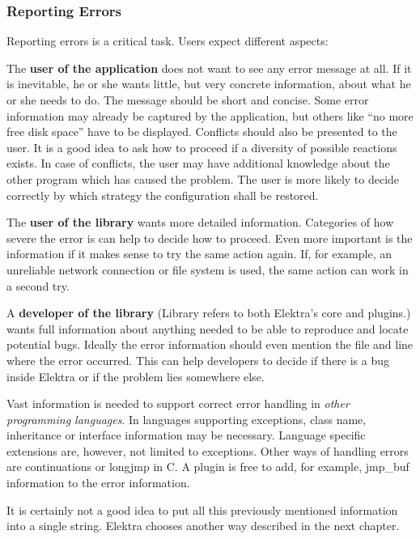 \subsubsection*{Reporting Errors}

Reporting errors is a critical task. Users expect different aspects\+:


\begin{DoxyItemize}
\item The {\bfseries user of the application} does not want to see any error message at all. If it is inevitable, he or she wants little, but very concrete information, about what he or she needs to do. The message should be short and concise. Some error information may already be captured by the application, but others like “no more free disk space” have to be displayed. Conflicts should also be presented to the user. It is a good idea to ask how to proceed if a diversity of possible reactions exists. In case of conflicts, the user may have additional knowledge about the other program which has caused the problem. The user is more likely to decide correctly by which strategy the configuration shall be restored.
\item The {\bfseries user of the library} wants more detailed information. Categories of how severe the error is can help to decide how to proceed. Even more important is the information if it makes sense to try the same action again. If, for example, an unreliable network connection or file system is used, the same action can work in a second try.
\item A {\bfseries developer of the library} (Library refers to both Elektra’s core and plugins.) wants full information about anything needed to be able to reproduce and locate potential bugs. Ideally the error information should even mention the file and line where the error occurred. This can help developers to decide if there is a bug inside Elektra or if the problem lies somewhere else.
\item Vast information is needed to support correct error handling in {\itshape other programming languages}. In languages supporting exceptions, class name, inheritance or interface information may be necessary. Language specific extensions are, however, not limited to exceptions. Other ways of handling errors are continuations or {\ttfamily longjmp} in C. A plugin is free to add, for example, {\ttfamily jmp\+\_\+buf} information to the error information.
\end{DoxyItemize}

It is certainly not a good idea to put all this previously mentioned information into a single string. Elektra chooses another way described in the next chapter.

